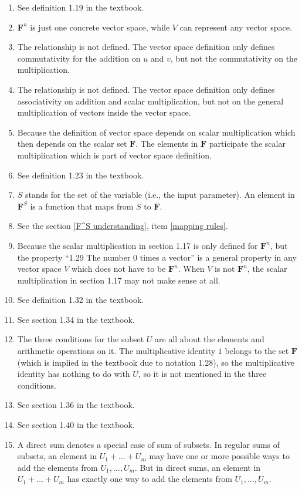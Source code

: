 \documentclass[12pt, letterpaper, oneside]{book}
\begin{document}
\begin{enumerate}
  \item See definition 1.19 in the textbook.
  \item $\mathbf{F}^n$ is just one concrete vector space, while $V$ can
    represent any vector space.
  \item The relationship is not defined. The vector space definition only
    defines commutativity for the addition on $u$ and $v$, but not the
    commutativity on the multiplication.
  \item The relationship is not defined. The vector space definition only
    defines associativity on addition and scalar multiplication, but not on
    the general multiplication of vectors inside the vector space.
  \item Because the definition of vector space depends on scalar multiplication
    which then depends on the scalar set $\mathbf{F}$. The elements in
    $\mathbf{F}$ participate the scalar multiplication which is part of vector
    space definition.
  \item See definition 1.23 in the textbook.
  \item $S$ stands for the set of the variable (i.e., the input parameter). An
    element in $\mathbf{F}^S$ is a function that maps from $S$ to $\mathbf{F}$.
  \item See the section \ref{F^S understanding}, item \ref{mapping rules}.
    \item Because the scalar multiplication in section 1.17 is only defined for
    $\mathbf{F}^n$, but the property ``1.29 The number 0 times a vector'' is a
    general property in any vector space $V$ which does not have to be
    $\mathbf{F}^n$. When $V$ is not $\mathbf{F}^n$, the scalar multiplication
    in section 1.17 may not make sense at all.
  \item See definition 1.32 in the textbook.
  \item See section 1.34 in the textbook.
  \item The three conditions for the subset $U$ are all about the elements and
    arithmetic operations on it. The multiplicative identity $1$ belongs to the
    set $\mathbf{F}$ (which is implied in the textbook due to notation 1.28),
    so the multiplicative identity has nothing to do with $U$, so it is not
    mentioned in the three conditions.
  \item See section 1.36 in the textbook.
  \item See section 1.40 in the textbook.
  \item A direct sum denotes a special case of sum of subsets. In regular sums
    of subsets, an element in $U_1 + \ldots + U_m$ may have one or more
    possible ways to add the elements from $U_1, \ldots, U_m$. But in direct
    sums, an element in $U_1 + \ldots + U_m$ has exactly one way to add the
    elements from $U_1, \ldots, U_m$.
\end{enumerate}
\end{document}
